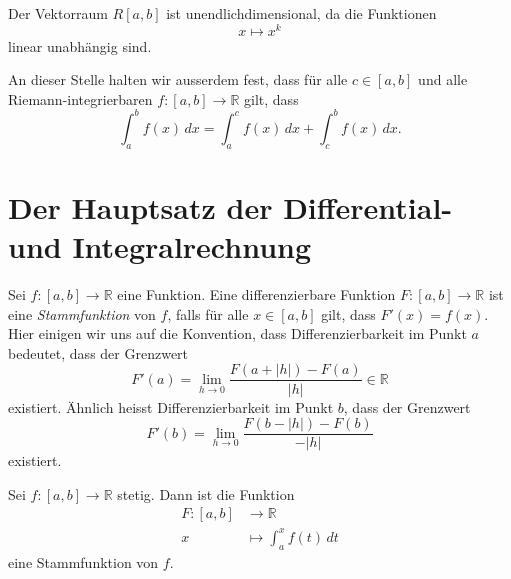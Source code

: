 \documentclass[../main.tex]{subfiles}
\begin{document}
\begin{remark}
  Der Vektorraum $R[a,b]$ ist unendlichdimensional, da die
  Funktionen 
  \[
   x \mapsto x^k 
  \]
  linear unabhängig sind.
\end{remark}

An dieser Stelle halten wir ausserdem fest, dass
für alle $c \in [a, b]$ und alle Riemann-integrierbaren
$f \colon [a, b] \to \mathbb{R}$ gilt, dass
\[
  \int_{a}^{b} f(x) \, dx = \int_{a}^{c} f(x) \, dx
  + \int_{c}^{b} f(x) \, dx.
\]

\section{Der Hauptsatz der Differential- und Integralrechnung}
\begin{definition}
  Sei $f \colon [a, b] \to \mathbb{R}$ eine Funktion.
  Eine differenzierbare
  Funktion $F \colon [a, b] \to \mathbb{R}$ ist
  eine \emph{Stammfunktion} von $f$, falls für
  alle $x \in [a, b]$ gilt, dass $F'(x) = f(x)$.
  Hier einigen wir uns auf die Konvention,
  dass Differenzierbarkeit im Punkt $a$ bedeutet, dass
  der Grenzwert
  \[
    F'(a) 
    = \lim_{h \to 0} \frac{F(a + |h|) - F(a)}{|h|} \in \mathbb{R}
  \]
  existiert. Ähnlich heisst Differenzierbarkeit im Punkt $b$,
  dass der Grenzwert
  \[
    F'(b) = \lim_{h \to 0} \frac{F(b - |h|) - F(b)}{-|h|}
  \]
  existiert.
\end{definition}


\begin{theorem}\label{thm:fundamental}
  Sei $f \colon [a, b] \to \mathbb{R}$ stetig.
  Dann ist die Funktion
  \begin{align*}
    F \colon [a, b] & \to \mathbb{R} \\
    x & \mapsto \int_{a}^{x} f(t) \, dt
  \end{align*}
  eine Stammfunktion von $f$.
\end{theorem}
\end{document}
